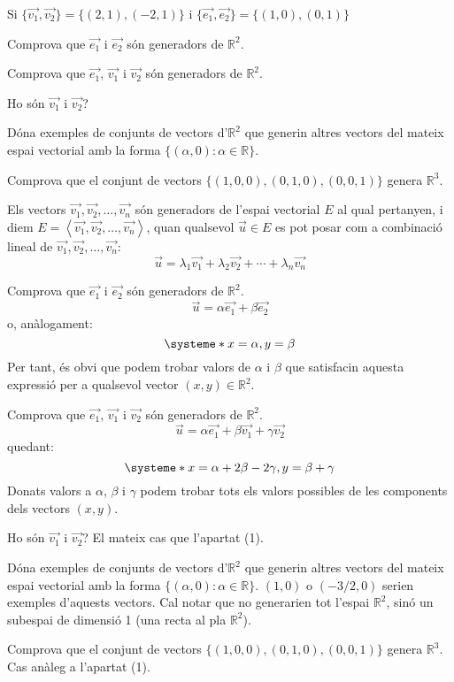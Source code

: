 \Exercise Si $\{\overrightarrow{v_1},\overrightarrow{v_2}\} = \{ (2,1),(-2,1) \}$ i $\{\overrightarrow{e_1},\overrightarrow{e_2}\} = \{ (1,0),(0,1) \}$
\begin{llista}
  \item Comprova que $\overrightarrow{e_1}$ i $\overrightarrow{e_2}$ són generadors de $\mathbb{R}^2$.
  \item Comprova que $\overrightarrow{e_1}$, $\overrightarrow{v_1}$ i $\overrightarrow{v_2}$ són generadors de $\mathbb{R}^2$.
  \item Ho són $\overrightarrow{v_1}$ i $\overrightarrow{v_2}$?
  \item Dóna exemples de conjunts de vectors d'$\mathbb{R}^2$ que generin altres vectors del mateix espai vectorial amb la forma $\{(\alpha,0):\alpha \in  \mathbb{R} \}$.
  \item Comprova que el conjunt de vectors $\{(1,0,0),(0,1,0),(0,0,1)\}$ genera $\mathbb{R}^3$.
\end{llista}

\Answer Els vectors $\overrightarrow{v_1},\overrightarrow{v_2}, \ldots, \overrightarrow{v_n}$ són generadors de l'espai vectorial $E$ al qual pertanyen, i diem $E=\left<\overrightarrow{v_1},\overrightarrow{v_2}, \ldots, \overrightarrow{v_n}\right>$, quan qualsevol $\vec{u}\in E$ es pot posar com a combinació lineal de $\overrightarrow{v_1},\overrightarrow{v_2}, \ldots, \overrightarrow{v_n}$:
\[\vec{u} = \lambda_1 \overrightarrow{v_1} + \lambda_2 \overrightarrow{v_2} + \cdots + \lambda_n \overrightarrow{v_n}\]


\begin{llista}
  \item Comprova que $\overrightarrow{e_1}$ i $\overrightarrow{e_2}$ són generadors de $\mathbb{R}^2$.
  \[\vec{u} = \alpha \overrightarrow{e_1} + \beta \overrightarrow{e_2}\]
  o, anàlogament:
  \[
    \systeme*{x=\alpha,y=\beta}
  \]
  Per tant, és obvi que podem trobar valors de $\alpha$ i $\beta$ que satisfacin aquesta expressió per a qualsevol vector $(x,y)\in \mathbb{R}^2$. 
  \item Comprova que $\overrightarrow{e_1}$, $\overrightarrow{v_1}$ i $\overrightarrow{v_2}$ són generadors de $\mathbb{R}^2$.
  \[\vec{u} = \alpha \overrightarrow{e_1} + \beta \overrightarrow{v_1} + \gamma \overrightarrow{v_2}\]
  quedant:
  \[
    \systeme*{x=\alpha+2\beta-2\gamma,y=\beta+\gamma}
  \]
  Donats  valors a $\alpha$, $\beta$ i $\gamma$ podem trobar tots els valors possibles de les components dels vectors $(x,y)$.
  \item Ho són $\overrightarrow{v_1}$ i $\overrightarrow{v_2}$?
  El mateix cas que l'apartat (1).
  \item Dóna exemples de conjunts de vectors d'$\mathbb{R}^2$ que generin altres vectors del mateix espai vectorial amb la forma $\{(\alpha,0):\alpha \in  \mathbb{R} \}$.
  $(1,0)$ o $(-3/2,0)$ serien exemples d'aquests vectors. Cal notar que no generarien tot l'espai $\mathbb{R}^2$, sinó un subespai de dimensió 1 (una recta al pla $\mathbb{R}^2$).
  \item Comprova que el conjunt de vectors $\{(1,0,0),(0,1,0),(0,0,1)\}$ genera $\mathbb{R}^3$.
  Cas anàleg a l'apartat (1).
\end{llista}
\blacksquare

